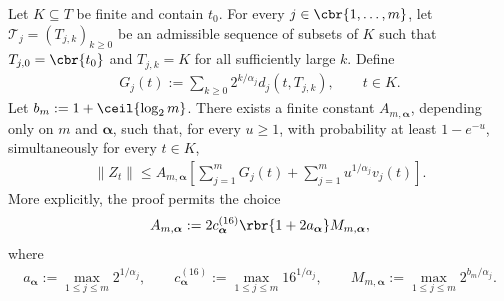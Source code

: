 \documentclass[11pt]{article}
\begin{document}
\begin{lemma}
\label{lem:multi_regime_finite_pointwise}
Let $K\subseteq T$ be finite and contain $t_0$. For every
$j\in\cbr{1,\ldots,m}$, let
$\mathcal T_j=(T_{j,k})_{k\ge0}$ be an admissible sequence of subsets
of $K$ such that $T_{j,0}=\cbr{t_0}$ and $T_{j,k}=K$ for all
sufficiently large $k$. Define
\begin{align*}
G_j(t)
:=
\sum_{k\ge0}2^{k/\alpha_j}d_j(t,T_{j,k}),
\qquad t\in K.
\end{align*}
Let $b_m
:=
1+\ceil{\log_2m}$. There exists a finite constant
$A_{m,\boldsymbol\alpha}$, depending only on $m$ and
$\boldsymbol\alpha$, such that, for every $u\ge1$, with probability
at least $1-e^{-u}$, simultaneously for every $t\in K$,
\begin{align}
\|Z_t\|
\le
A_{m,\boldsymbol\alpha}
\left[
\sum_{j=1}^mG_j(t)
+
\sum_{j=1}^m u^{1/\alpha_j}v_j(t)
\right].
\label{eq:multi_regime_finite_chain_bound}
\end{align}
More explicitly, the proof permits the choice
\begin{align}
A_{m,\boldsymbol\alpha}
:=
2c_{\boldsymbol\alpha}^{(16)}
\rbr{1+2a_{\boldsymbol\alpha}}
M_{m,\boldsymbol\alpha},
\label{eq:multi_regime_explicit_finite_constant}
\end{align}
where
\begin{align*}
a_{\boldsymbol\alpha}
:=
\max_{1\le j\le m}2^{1/\alpha_j},
\qquad
c_{\boldsymbol\alpha}^{(16)}
:=
\max_{1\le j\le m}16^{1/\alpha_j},
\qquad
M_{m,\boldsymbol\alpha}
:=
\max_{1\le j\le m}2^{b_m/\alpha_j}.
\end{align*}
\end{lemma}
\end{document}
